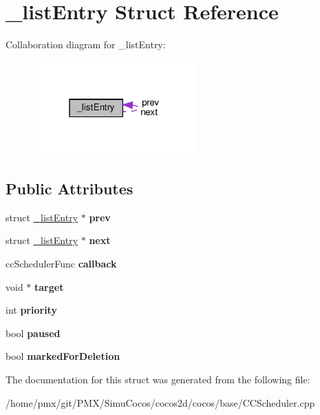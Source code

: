 \hypertarget{struct__listEntry}{}\section{\+\_\+list\+Entry Struct Reference}
\label{struct__listEntry}


Collaboration diagram for \+\_\+list\+Entry\+:
\nopagebreak
\begin{figure}[H]
\begin{center}
\leavevmode
\includegraphics[width=178pt]{struct__listEntry__coll__graph}
\end{center}
\end{figure}
\subsection*{Public Attributes}
\begin{DoxyCompactItemize}
\item 
\mbox{\label{struct__listEntry_a4b1af96e843127a85e08586d39ec0950}} 
struct \hyperlink{struct__listEntry}{\+\_\+list\+Entry} $\ast$ {\bfseries prev}
\item 
\mbox{\label{struct__listEntry_afbaca78f6b0462638a5dd8802dbbb028}} 
struct \hyperlink{struct__listEntry}{\+\_\+list\+Entry} $\ast$ {\bfseries next}
\item 
\mbox{\label{struct__listEntry_a214bbd679804f431ea25faf3094da863}} 
cc\+Scheduler\+Func {\bfseries callback}
\item 
\mbox{\label{struct__listEntry_a826e351c7a672141ae24738ec905d412}} 
void $\ast$ {\bfseries target}
\item 
\mbox{\label{struct__listEntry_aaa7a7fe4fbceba324d107cd6bc9aeae7}} 
int {\bfseries priority}
\item 
\mbox{\label{struct__listEntry_a15bf6ec32bb10da5d4599b3c02b5d47b}} 
bool {\bfseries paused}
\item 
\mbox{\label{struct__listEntry_a206fea1e0f69ed61fca0c61589c48d04}} 
bool {\bfseries marked\+For\+Deletion}
\end{DoxyCompactItemize}


The documentation for this struct was generated from the following file\+:\begin{DoxyCompactItemize}
\item 
/home/pmx/git/\+P\+M\+X/\+Simu\+Cocos/cocos2d/cocos/base/C\+C\+Scheduler.\+cpp\end{DoxyCompactItemize}
